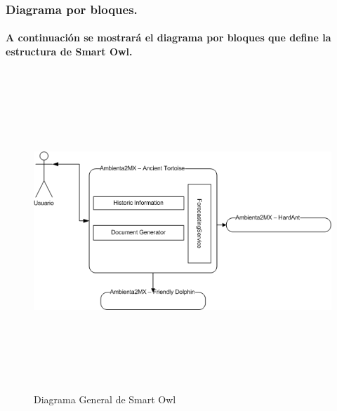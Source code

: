   \newpage
  \begin{landscape}
      \subsubsection{Diagrama por bloques.}
        \paragraph{A continuación se mostrará el diagrama por bloques que define la estructura de Smart Owl.}
        \begin{figure}[b!]
        \centering
        \includegraphics[width=22.5cm,height=12cm]{./images/DiagramaAncientTortoise.png}
        \caption{Diagrama General de Smart Owl}
      \end{figure}
      \end{landscape}
      \newpage

